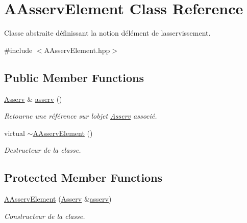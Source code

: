 \hypertarget{classAAsservElement}{}\section{A\+Asserv\+Element Class Reference}
\label{classAAsservElement}


Classe abstraite définissant la notion d\textquotesingle{}élément de l\textquotesingle{}asservissement.  




{\ttfamily \#include $<$A\+Asserv\+Element.\+hpp$>$}

\subsection*{Public Member Functions}
\begin{DoxyCompactItemize}
\item 
\mbox{\label{classAAsservElement_a934d1e50fbbd3d52be8cdc83ed922f25}} 
\hyperlink{classAsserv}{Asserv} \& \hyperlink{classAAsservElement_a934d1e50fbbd3d52be8cdc83ed922f25}{asserv} ()
\begin{DoxyCompactList}\small\item\em Retourne une référence sur l\textquotesingle{}objet \hyperlink{classAsserv}{Asserv} associé. \end{DoxyCompactList}\item 
\mbox{\label{classAAsservElement_a0be48eb52c88b2ca11169d6a3280b11d}} 
virtual \hyperlink{classAAsservElement_a0be48eb52c88b2ca11169d6a3280b11d}{$\sim$\+A\+Asserv\+Element} ()
\begin{DoxyCompactList}\small\item\em Destructeur de la classe. \end{DoxyCompactList}\end{DoxyCompactItemize}
\subsection*{Protected Member Functions}
\begin{DoxyCompactItemize}
\item 
\hyperlink{classAAsservElement_af0b6767d631173c912e7e16e6f1c6db1}{A\+Asserv\+Element} (\hyperlink{classAsserv}{Asserv} \&\hyperlink{classAAsservElement_a934d1e50fbbd3d52be8cdc83ed922f25}{asserv})
\begin{DoxyCompactList}\small\item\em Constructeur de la classe. \end{DoxyCompactList}\end{DoxyCompactItemize}


